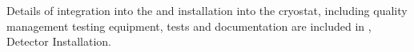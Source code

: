 Details of  integration into the  and installation into the cryostat, including quality management testing equipment, tests and documentation are included in \spchinstall{}, Detector Installation. 



    






